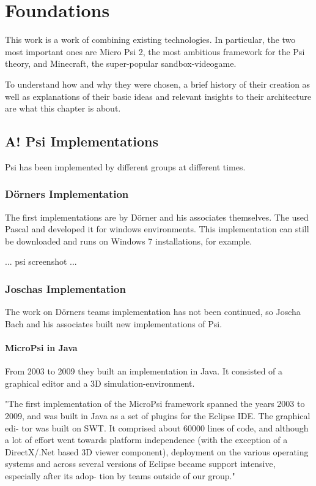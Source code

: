\chapter{Foundations}
This work is a work of combining existing technologies. In particular, the two most important ones are Micro Psi 2, the most ambitious framework for the Psi theory, and Minecraft, the super-popular sandbox-videogame.

To understand how and why they were chosen, a brief history of their creation as well as explanations of their basic ideas and relevant insights to their architecture are what this chapter is about.

    \section{A! Psi Implementations}
Psi has been implemented by different groups at different times.

        \subsection{Dörners Implementation}
The first implementations are by Dörner and his associates themselves. The used Pascal and developed it for windows environments. This implementation can still be downloaded and runs on Windows 7 installations, for example.

... psi screenshot ...


        \subsection{Joschas Implementation}
The work on Dörners teams implementation has not been continued, so Joscha Bach and his associates built new implementations of Psi.

            \subsubsection{MicroPsi in Java}
From 2003 to 2009 they built an implementation in Java. It consisted of a graphical editor and a 3D simulation-environment.~\cite{conf/agi/Bach12}  

"The first implementation of the MicroPsi framework spanned the years 2003 to 2009, and was built in Java as a set of plugins for the Eclipse IDE. The graphical edi- tor was built on SWT. It comprised about 60000 lines of code, and although a lot of effort went towards platform independence (with the exception of a DirectX/.Net based 3D viewer component), deployment on the various operating systems and across several versions of Eclipse became support intensive, especially after its adop- tion by teams outside of our group."~\cite{conf/agi/Bach12}

